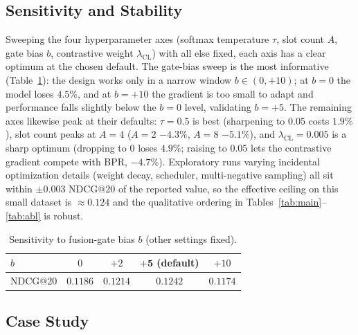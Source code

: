 \documentclass[12pt,a4paper]{article}
\begin{document}
\subsection{Sensitivity and Stability}

Sweeping the four hyperparameter axes (softmax temperature $\tau$, slot count $A$, gate bias $b$, contrastive weight $\lambda_{\mathrm{CL}}$) with all else fixed, each axis has a clear optimum at the chosen default. The gate-bias sweep is the most informative (Table~\ref{tab:bias}): the design works only in a narrow window $b\in(0,+10)$; at $b{=}0$ the model loses $4.5\%$, and at $b{=}+10$ the gradient is too small to adapt and performance falls slightly below the $b{=}0$ level, validating $b{=}+5$. The remaining axes likewise peak at their defaults: $\tau{=}0.5$ is best (sharpening to $0.05$ costs $1.9\%$), slot count peaks at $A{=}4$ ($A{=}2$ $-4.3\%$, $A{=}8$ $-5.1\%$), and $\lambda_{\mathrm{CL}}{=}0.005$ is a sharp optimum (dropping to $0$ loses $4.9\%$; raising to $0.05$ lets the contrastive gradient compete with BPR, $-4.7\%$). Exploratory runs varying incidental optimization details (weight decay, scheduler, multi-negative sampling) all sit within $\pm0.003$ NDCG@20 of the reported value, so the effective ceiling on this small dataset is $\approx 0.124$ and the qualitative ordering in Tables~\ref{tab:main}--\ref{tab:abl} is robust.

\begin{table}[!ht]
\centering
\caption{Sensitivity to fusion-gate bias $b$ (other settings fixed).}
\label{tab:bias}
\small
\begin{tabular}{lcccc}
\toprule
$b$ & $0$ & $+2$ & $\mathbf{+5}$ (default) & $+10$ \\
\midrule
NDCG@20 & $0.1186$ & $0.1214$ & $\mathbf{0.1242}$ & $0.1174$ \\
\bottomrule
\end{tabular}
\end{table}

\subsection{Case Study}
\end{document}
